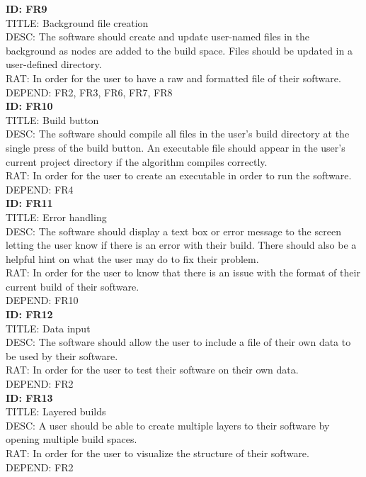 \documentclass[journal,10pt,onecolumn,compsoc]{IEEEtran} \usepackage[margin=1.0in]{geometry} \usepackage{pdfpages} \usepackage{graphicx}
\begin{document}
\noindent
\textbf{ID: FR9}\\
TITLE: Background file creation\\
DESC: The software should create and update user-named files in the background as nodes are added to the build space. 
Files should be updated in a user-defined directory.\\
RAT: In order for the user to have a raw and formatted file of their software.\\
DEPEND: FR2, FR3, FR6, FR7, FR8\\

\noindent
\textbf{ID: FR10}\\
TITLE: Build button\\
DESC: The software should compile all files in the user's build directory at the single press of the build button. 
An executable file should appear in the user's current project directory if the algorithm compiles correctly.\\
RAT: In order for the user to create an executable in order to run the software.\\
DEPEND: FR4\\

\noindent
\textbf{ID: FR11}\\
TITLE: Error handling\\
DESC: The software should display a text box or error message to the screen letting the user know if there is an error with their build. 
There should also be a helpful hint on what the user may do to fix their problem.\\
RAT: In order for the user to know that there is an issue with the format of their current build of their software.\\
DEPEND: FR10\\

\noindent
\textbf{ID: FR12}\\
TITLE: Data input\\
DESC: The software should allow the user to include a file of their own data to be used by their software.\\
RAT: In order for the user to test their software on their own data.\\
DEPEND: FR2\\

\noindent
\textbf{ID: FR13}\\
TITLE: Layered builds\\
DESC: A user should be able to create multiple layers to their software by opening multiple build spaces.\\
RAT: In order for the user to visualize the structure of their software.\\
DEPEND: FR2\\
\end{document}
